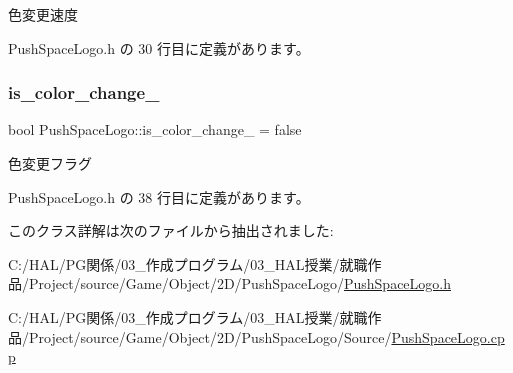 色変更速度 



 Push\+Space\+Logo.\+h の 30 行目に定義があります。

\mbox{\label{class_push_space_logo_a1690cbbed4e0b79bf99a406565f55b0f}} 
\subsubsection{\texorpdfstring{is\+\_\+color\+\_\+change\+\_\+}{is\_color\_change\_}}
{\footnotesize\ttfamily bool Push\+Space\+Logo\+::is\+\_\+color\+\_\+change\+\_\+ = false\hspace{0.3cm}{\ttfamily [private]}}



色変更フラグ 



 Push\+Space\+Logo.\+h の 38 行目に定義があります。



このクラス詳解は次のファイルから抽出されました\+:\begin{DoxyCompactItemize}
\item 
C\+:/\+H\+A\+L/\+P\+G関係/03\+\_\+作成プログラム/03\+\_\+\+H\+A\+L授業/就職作品/\+Project/source/\+Game/\+Object/2\+D/\+Push\+Space\+Logo/\mbox{\hyperlink{_push_space_logo_8h}{Push\+Space\+Logo.\+h}}\item 
C\+:/\+H\+A\+L/\+P\+G関係/03\+\_\+作成プログラム/03\+\_\+\+H\+A\+L授業/就職作品/\+Project/source/\+Game/\+Object/2\+D/\+Push\+Space\+Logo/\+Source/\mbox{\hyperlink{_push_space_logo_8cpp}{Push\+Space\+Logo.\+cpp}}\end{DoxyCompactItemize}
